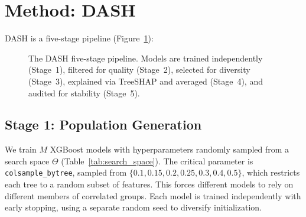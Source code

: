 \documentclass[11pt]{article}
\newcommand{\dash}{\textsc{DASH}}
\begin{document}
\section{Method: DASH}
\label{sec:method}

\dash{} is a five-stage pipeline (Figure~\ref{fig:pipeline}):

\begin{figure}[htbp]
\centering
{}
\caption{The \dash{} five-stage pipeline. Models are trained independently
(Stage~1), filtered for quality (Stage~2), selected for diversity (Stage~3),
explained via TreeSHAP and averaged (Stage~4), and audited for stability
(Stage~5).}
\label{fig:pipeline}
\end{figure}

\subsection{Stage 1: Population Generation}

We train $M$ XGBoost \citep{chen2016xgboost} models with hyperparameters randomly sampled from a
search space $\Theta$ (Table~\ref{tab:search_space}). The critical
parameter is \texttt{colsample\_bytree}, sampled from
$\{0.1, 0.15, 0.2, 0.25, 0.3, 0.4, 0.5\}$, which restricts each tree
to a random subset of features. This forces different models to rely on
different members of correlated groups. Each model is trained independently
with early stopping, using a separate random seed to diversify initialization.
\end{document}
